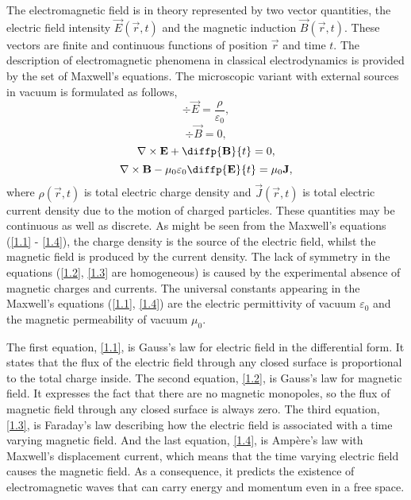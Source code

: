The electromagnetic field is in theory represented by two vector quantities, the electric field intensity $ \vec{E}\left( \vec{r}, t \right) $ and the magnetic induction $ \vec{B}\left( \vec{r}, t \right) $. These vectors are finite and continuous functions of position $ \vec{r} $ and time $ t $. The description of electromagnetic phenomena in classical electrodynamics is provided by the set of Maxwell's equations. The microscopic variant with external sources in vacuum is formulated as follows,
\begin{equation}
\label{1.1}
\div{\vec{E}} = \frac{\rho}{\varepsilon_0},
\end{equation}
\begin{equation}
\label{1.2}
\div{\vec{B}} = 0,
\end{equation}
\begin{equation}
\label{1.3}
\rot{\vec{E}} + \diffp{\vec{B}}{t} = 0,
\end{equation}
\begin{equation}
\label{1.4}
\rot{\vec{B}} - \mu_0 \varepsilon_0 \diffp{\vec{E}}{t}= \mu_0 \vec{J},
\end{equation}
where $ \rho\left( \vec{r}, t \right) $ is total electric charge density and $ \vec{J}\left( \vec{r}, t \right) $ is total electric current density due to the motion of charged particles. These quantities may be continuous as well as discrete. As might be seen from the Maxwell's equations (\ref{1.1} - \ref{1.4}), the charge density is the source of the electric field, whilst the magnetic field is produced by the current density. The lack of symmetry in the equations (\ref{1.2}, \ref{1.3} are homogeneous) is caused by the experimental absence of magnetic charges and currents. The universal constants appearing in the Maxwell's equations (\ref{1.1}, \ref{1.4}) are the electric permittivity of vacuum $ \varepsilon_0 $ and the magnetic permeability of vacuum $ \mu_0 $.

The first equation, \ref{1.1}, is Gauss's law for electric field in the differential form. It states that the flux of the electric field through any closed surface is proportional to the total charge inside. The second equation, \ref{1.2}, is Gauss's law for magnetic field. It expresses the fact that there are no magnetic monopoles, so the flux of magnetic field through any closed surface is always zero. The third equation, \ref{1.3}, is Faraday's law describing how the electric field is associated with a time varying magnetic field. And the last equation, \ref{1.4}, is Amp\`ere's law with Maxwell's displacement current, which means that the time varying electric field causes the magnetic field. As a consequence, it predicts the existence of electromagnetic waves that can carry energy and momentum even in a free space.

